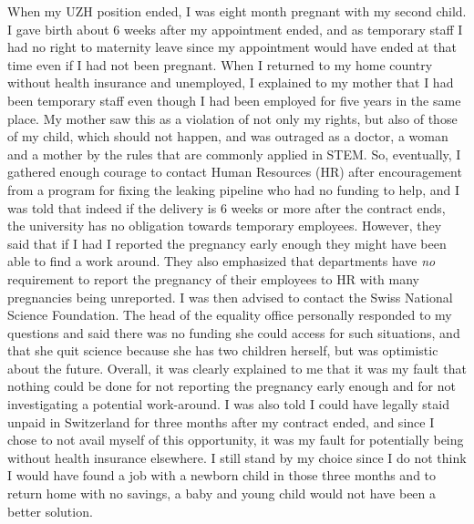 \documentclass[utf8]{frontiersSCNS} %
\begin{document}
When my UZH position ended, I was eight month pregnant with my second child. I gave birth about 6 weeks after my appointment ended, and as temporary staff I had no right to maternity leave since my appointment would have ended at that time even if I had not been pregnant. When I returned to my home country without health insurance and unemployed, I explained to my mother that I had been temporary staff even though I had been employed for five years in the same place. My mother saw this as a violation of not only my rights, but also of those of my child, which should not happen, and was outraged as a doctor, a woman and a mother by the rules that are commonly applied in STEM.  So, eventually, I gathered enough courage to contact Human Resources (HR) after encouragement from a program for fixing the leaking pipeline who had no funding to help, and I was told that indeed if the delivery is 6 weeks or more after the contract ends, the university has no obligation towards temporary employees. However, they said that if I had I reported the pregnancy early enough they might have been able to find a work around. They also emphasized that departments have {\it no} requirement to report the pregnancy of their employees to HR with many pregnancies being unreported. I was then advised to contact the Swiss National Science Foundation. The head of the equality office personally responded to my questions and said there was no funding she could access for such situations, and that she quit science because she has two children herself, but was optimistic about the future. Overall, it was clearly explained to me that it was my fault that nothing could be done for not reporting the pregnancy early enough and for not investigating a potential work-around. I was also told I could have legally staid unpaid in Switzerland for three months after my contract ended, and since I chose to not avail myself of this opportunity, it was my fault for potentially being without health insurance elsewhere. I still stand by my choice since I do not think I would have found a job with a newborn child in those three months and to return home with no savings, a baby and young child would not have been a better solution.%
\end{document}
